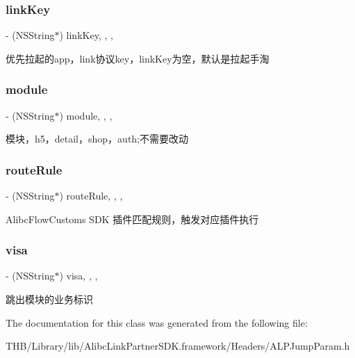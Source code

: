 \subsubsection{\texorpdfstring{link\+Key}{linkKey}}
{\footnotesize\ttfamily -\/ (N\+S\+String$\ast$) link\+Key\hspace{0.3cm}{\ttfamily [read]}, {\ttfamily [write]}, {\ttfamily [nonatomic]}, {\ttfamily [copy]}}

优先拉起的app，link协议key，link\+Key为空，默认是拉起手淘 \mbox{\label{interface_a_l_p_jump_param_a0c9f52786d16faa0daf5f8dcc939572d}} 
\subsubsection{\texorpdfstring{module}{module}}
{\footnotesize\ttfamily -\/ (N\+S\+String$\ast$) module\hspace{0.3cm}{\ttfamily [read]}, {\ttfamily [write]}, {\ttfamily [nonatomic]}, {\ttfamily [copy]}}

模块，h5，detail，shop，auth;不需要改动 \mbox{\label{interface_a_l_p_jump_param_aaf321b74f7d51bc268e28dc55f87c63c}} 
\subsubsection{\texorpdfstring{route\+Rule}{routeRule}}
{\footnotesize\ttfamily -\/ (N\+S\+String$\ast$) route\+Rule\hspace{0.3cm}{\ttfamily [read]}, {\ttfamily [write]}, {\ttfamily [nonatomic]}, {\ttfamily [copy]}}

Alibc\+Flow\+Customs S\+DK 插件匹配规则，触发对应插件执行 \mbox{\label{interface_a_l_p_jump_param_ad91224f6c812c2a520b692e703f7fc17}} 
\subsubsection{\texorpdfstring{visa}{visa}}
{\footnotesize\ttfamily -\/ (N\+S\+String$\ast$) visa\hspace{0.3cm}{\ttfamily [read]}, {\ttfamily [write]}, {\ttfamily [nonatomic]}, {\ttfamily [copy]}}

跳出模块的业务标识 

The documentation for this class was generated from the following file\+:\begin{DoxyCompactItemize}
\item 
T\+H\+B/\+Library/lib/\+Alibc\+Link\+Partner\+S\+D\+K.\+framework/\+Headers/A\+L\+P\+Jump\+Param.\+h\end{DoxyCompactItemize}

